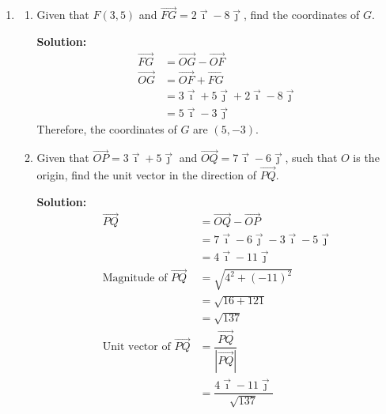\documentclass{report}
\newcommand{\sol}{\textbf{Solution:}}
\begin{document}
\begin{enumerate}[leftmargin=*]
    \item \begin{enumerate}
              \item Given that $F(3,5)$ and $\overrightarrow{F G}=2 \vec{\imath}-8 \vec{\jmath}$,
                    find the coordinates of $G$.

                    \sol{}
                    \begin{align*}
                        \overrightarrow{FG} & = \overrightarrow{OG} - \overrightarrow{OF}                     \\
                        \overrightarrow{OG} & = \overrightarrow{OF} + \overrightarrow{FG}                     \\
                                            & = 3\vec{\imath} + 5\vec{\jmath} + 2\vec{\imath} - 8\vec{\jmath} \\
                                            & = 5\vec{\imath} - 3\vec{\jmath}
                    \end{align*}
                    Therefore, the coordinates of $G$ are $(5, -3)$.

              \item Given that $\overrightarrow{O P}=3 \vec{\imath}+5 \vec{\jmath}$ and
                    $\overrightarrow{O Q}=7 \vec{\imath}-6 \vec{\jmath}$, such that $O$ is the
                    origin, find the unit vector in the direction of $\overrightarrow{P Q}$.

                    \sol{}
                    \begin{align*}
                        \overrightarrow{PQ}                         & = \overrightarrow{OQ} - \overrightarrow{OP}                     \\
                                                                    & = 7\vec{\imath} - 6\vec{\jmath} - 3\vec{\imath} - 5\vec{\jmath} \\
                                                                    & = 4\vec{\imath} - 11\vec{\jmath}                                \\
                        \text{Magnitude of $\overrightarrow{PQ}$}   & = \sqrt{4^2 + (-11)^2}                                          \\
                                                                    & = \sqrt{16 + 121}                                               \\
                                                                    & = \sqrt{137}                                                    \\
                        \text{Unit vector of $\overrightarrow{PQ}$} & = \dfrac{\overrightarrow{PQ}}{|\overrightarrow{PQ}|}            \\
                                                                    & = \dfrac{4\vec{\imath} - 11\vec{\jmath}}{\sqrt{137}}
                    \end{align*}


\end{enumerate}
\end{enumerate}
\end{document}
